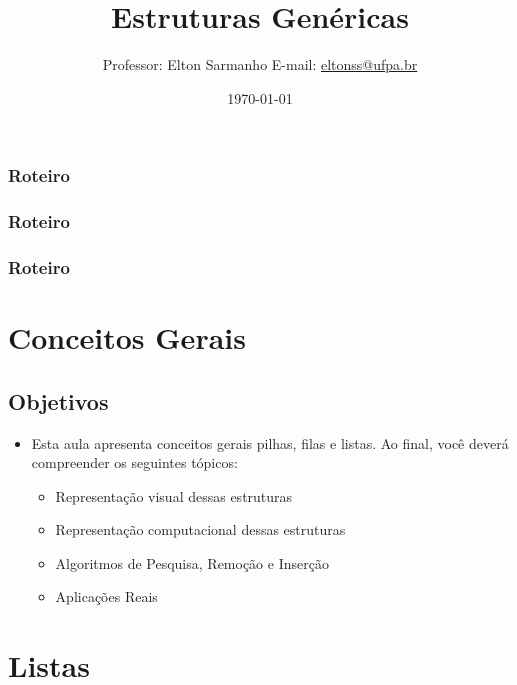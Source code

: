 \documentclass{beamer}
\title[Estrutura de Dados I]{Estruturas Genéricas}
\author[Elton Sarmanho]{ 
Professor: Elton Sarmanho\inst{1} 
\newline
E-mail: \href{mailto:eltonss@ufpa.br}{eltonss@ufpa.br}\newline
\href{https://github.com/eltonsarmanho}{\faGithub} \href{https://www.linkedin.com/in/elton-sarmanho-836553185/}{\faLinkedinSquare}
}
\institute[UFPA]{
   \inst{1}%
     Faculdade de Sistemas de Informação - UFPA/CUTINS
     }
\date{\today}
\begin{document}
\begin{frame}
\titlepage
\end{frame}

\begin{frame}
\frametitle{Roteiro}
\tableofcontents[sections={1-2}]
\end{frame}
\begin{frame}
\frametitle{Roteiro}
\tableofcontents[sections={3-4}]
\end{frame}
\begin{frame}
\frametitle{Roteiro}
\tableofcontents[sections={5-6}]
\end{frame}

%
%
%
\section{Conceitos Gerais}

\subsection{Objetivos}
\begin{frame}{}
    
\begin{itemize}
 \item \hspace{-1 pt}Esta aula apresenta conceitos gerais pilhas, filas e listas. Ao final, você deverá compreender os seguintes tópicos:
 \begin{itemize}
  \item Representação visual dessas estruturas
  \item Representação computacional dessas estruturas
  \item Algoritmos de Pesquisa, Remoção e Inserção
  \item Aplicações Reais
 \end{itemize} 
\end{itemize}
\end{frame}

\section{Listas}
\end{document}
